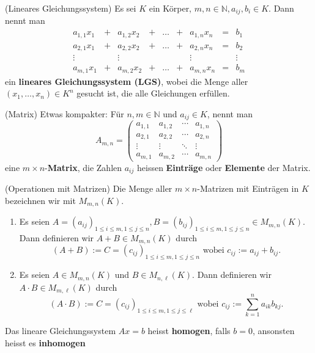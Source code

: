 \documentclass[../Algebra_script.tex]{subfiles}
\begin{document}
\begin{definition}{(Lineares Gleichungssystem)}
	Es sei $K$ ein Körper, $m, n \in \mathbb{N}, a_{ij}, b_i \in K$. Dann nennt man
	\[\begin{matrix}
		a_{1,1}x_1 &+ &a_{1,2}x_2 &+ &\ldots &+ &a_{1,n}x_n &= &b_1 \\
		a_{2,1}x_1 &+ &a_{2,2}x_2 &+ &\ldots &+ &a_{2,n}x_n &= &b_2\\
		 \vdots    &  &\vdots     &  &       & &\vdots     & &\vdots\\
		a_{m,1}x_1 &+ &a_{m,2}x_2 &+ &\ldots &+ &a_{m,n}x_n &= &b_m 
	\end{matrix}\]	
	ein \textbf{lineares Gleichungssystem (LGS)}, wobei die Menge aller $(x_1, \ldots, x_n) \in K^n$ gesucht ist, die alle Gleichungen erfüllen.	
\end{definition}

\begin{definition}{(Matrix)}
	Etwas kompakter: Für $n, m \in \mathbb{N}$ und $a_{ij} \in K$, nennt man
	\[A_{m,n} = 
		\begin{pmatrix}
			a_{1,1} & a_{1,2} & \cdots & a_{1,n} \\
			a_{2,1} & a_{2,2} & \cdots & a_{2,n} \\
			\vdots  & \vdots  & \ddots & \vdots  \\
			a_{m,1} & a_{m,2} & \cdots & a_{m,n} 
 		\end{pmatrix}
 	\]
 	eine $m \times n$-\textbf{Matrix}, die Zahlen $a_{ij}$ heissen \textbf{Einträge} oder \textbf{Elemente} der Matrix.
\end{definition}

\begin{definition}{(Operationen mit Matrizen)}
	Die Menge aller $m \times n$-Matrizen mit Einträgen in $K$ bezeichnen wir mit $M_{m,n}(K)$.
	\begin{enumerate}
		\item Es seien $A = (a_{ij})_{1 \leq i \leq m, 1 \leq j \leq n}, B = (b_{ij})_{1 \leq i \leq m, 1 \leq j \leq n} \in M_{m, n}(K)$. Dann definieren wir $A + B \in M_{m, n}(K)$ durch
		\[(A + B) := C = (c_{ij})_{1 \leq i \leq m, 1 \leq j \leq n} \text{ wobei } c_{ij} := a_{ij} + b_{ij} .\]
		\item Es seien $A \in M_{m, n}(K)$ und $B \in M_{n, \ell}(K)$. Dann definieren wir $A \cdot B \in M_{m, \ell}(K)$ durch
		\[(A \cdot B) := C = (c_{ij})_{1 \leq i \leq m, 1 \leq j \leq \ell} \text{ wobei } c_{ij} := \sum_{k=1}^{n} a_{ik}b_{kj} .\]  
	\end{enumerate}
\end{definition}

\begin{definition}
	Das lineare Gleichungssystem $Ax = b$ heisst \textbf{homogen}, falls $b = 0$, ansonsten heisst es \textbf{inhomogen}
\end{definition}
\end{document}
